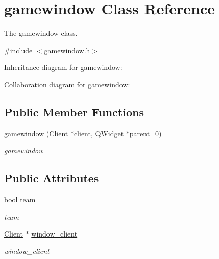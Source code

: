\hypertarget{classgamewindow}{}\section{gamewindow Class Reference}
\label{classgamewindow}


The gamewindow class.  




{\ttfamily \#include $<$gamewindow.\+h$>$}



Inheritance diagram for gamewindow\+:


Collaboration diagram for gamewindow\+:
\subsection*{Public Member Functions}
\begin{DoxyCompactItemize}
\item 
\hyperlink{classgamewindow_a74b28d4cdf1e801e12a12ec1ad6d9d3c}{gamewindow} (\hyperlink{class_client}{Client} $\ast$client, Q\+Widget $\ast$parent=0)
\begin{DoxyCompactList}\small\item\em gamewindow \end{DoxyCompactList}\end{DoxyCompactItemize}
\subsection*{Public Attributes}
\begin{DoxyCompactItemize}
\item 
bool \hyperlink{classgamewindow_a2f3852a0d7279f95198e92a815135c2d}{team}\hypertarget{classgamewindow_a2f3852a0d7279f95198e92a815135c2d}{}\label{classgamewindow_a2f3852a0d7279f95198e92a815135c2d}

\begin{DoxyCompactList}\small\item\em team \end{DoxyCompactList}\item 
\hyperlink{class_client}{Client} $\ast$ \hyperlink{classgamewindow_a81cb31570e1ea9cb9d18daa20443c607}{window\+\_\+client}\hypertarget{classgamewindow_a81cb31570e1ea9cb9d18daa20443c607}{}\label{classgamewindow_a81cb31570e1ea9cb9d18daa20443c607}

\begin{DoxyCompactList}\small\item\em window\+\_\+client \end{DoxyCompactList}\end{DoxyCompactItemize}


